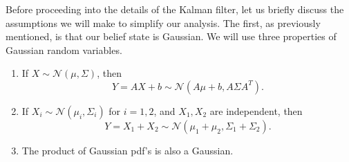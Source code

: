 \documentclass[twoside]{article}
\begin{document}
\par
Before proceeding into the details of the Kalman filter, let us briefly discuss the assumptions we will make to simplify our analysis. The first, as previously mentioned, is that our belief state is Gaussian. We will use three properties of Gaussian random variables.
\begin{enumerate}
    \item If $X \sim \mathcal{N}(\mu, \Sigma)$, then
    \[
    Y = AX + b \sim \mathcal{N}(A\mu+b, A\Sigma A^T).
    \]
    \item If $X_i \sim \mathcal{N}(\mu_i, \Sigma_i)$ for $i = 1,2$, and $X_1, X_2$ are independent, then
    \[
    Y = X_1 + X_2 \sim \mathcal{N}(\mu_1 + \mu_2, \Sigma_1 + \Sigma_2).
    \]
    \item The product of Gaussian pdf's is also a Gaussian.
\end{enumerate}
\end{document}
